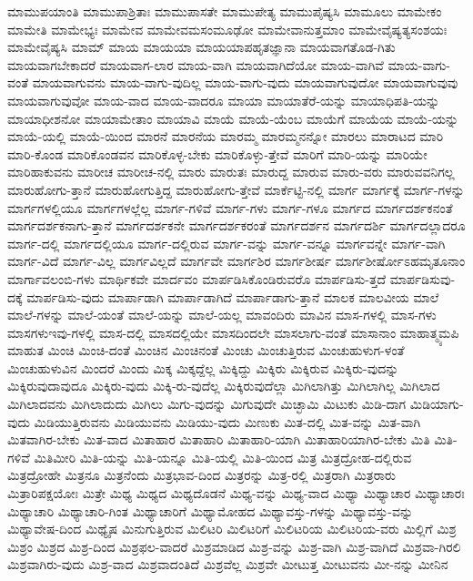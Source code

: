{ಮಾಮುಪಯಾಂತಿ
ಮಾಮುಪಾಶ್ರಿತಾಃ
ಮಾಮುಪಾಸತೇ
ಮಾಮುಪೇತ್ಯ
ಮಾಮುಪೈಷ್ಯಸಿ
ಮಾಮೂಲು
ಮಾಮೇಕಂ
ಮಾಮೇತಿ
ಮಾಮೇಭ್ಯಃ
ಮಾಮೇವ
ಮಾಮೇವಮಸಂಮೂಢೋ
ಮಾಮೇವಾನುತ್ತಮಾಂ
ಮಾಮೇವೈಷ್ಯತ್ಯಸಂಶಯಃ
ಮಾಮೇವೈಷ್ಯಸಿ
ಮಾಮ್
ಮಾಯ
ಮಾಯಯಾ
ಮಾಯಯಾಪಹೃತಜ್ಞಾನಾ
ಮಾಯವಾಗತೊಡ-ಗಿತು
ಮಾಯವಾಗಬೇಕಾದರೆ
ಮಾಯವಾಗ-ಲಾರ
ಮಾಯ-ವಾಗಿ
ಮಾಯವಾಗಿದೆಯೋ
ಮಾಯ-ವಾಗಿವೆ
ಮಾಯ-ವಾಗು-ವಂತೆ
ಮಾಯವಾಗುವನು
ಮಾಯ-ವಾಗು-ವುದಿಲ್ಲ
ಮಾಯ-ವಾಗು-ವುದು
ಮಾಯವಾಗುವುದೋ
ಮಾಯವಾಗುವುವು
ಮಾಯವಾಗುವುವೋ
ಮಾಯ-ವಾದ
ಮಾಯ-ವಾದರೂ
ಮಾಯಾ
ಮಾಯಾತೆರೆ-ಯನ್ನು
ಮಾಯಾಧಿಪತಿ-ಯನ್ನು
ಮಾಯಾಧೀಶನೋ
ಮಾಯಾಮೇತಾಂ
ಮಾಯಾವಿ
ಮಾಯೆ
ಮಾಯೆ-ಯೆಂಬ
ಮಾಯೆಗೆ
ಮಾಯೆಯ
ಮಾಯೆ-ಯನ್ನು
ಮಾಯೆ-ಯಲ್ಲಿ
ಮಾಯೆ-ಯಿಂದ
ಮಾರನೆ
ಮಾರನೆಯ
ಮಾರಮ್ಮ
ಮಾರಮ್ಮನನ್ನೋ
ಮಾರಲು
ಮಾರಾಟದ
ಮಾರಿ
ಮಾರಿ-ಕೊಂಡ
ಮಾರಿಕೊಂಡವನ
ಮಾರಿಕೊಳ್ಳ-ಬೇಕು
ಮಾರಿಕೊಳ್ಳು-ತ್ತೇವೆ
ಮಾರಿಗೆ
ಮಾರಿ-ಯನ್ನು
ಮಾರಿಯೇ
ಮಾರಿಹಾಕುವನು
ಮಾರೀಚ
ಮಾರೀಚ-ನಲ್ಲಿ
ಮಾರು
ಮಾರುತಃ
ಮಾರುದ್ದ
ಮಾರುವ
ಮಾರು-ವರು
ಮಾರುವವನಿಗಲ್ಲ
ಮಾರುಹೋಗು-ತ್ತಾನೆ
ಮಾರುಹೋಗುತ್ತಿದ್ದ
ಮಾರುಹೋಗು-ತ್ತೇವೆ
ಮಾರ್ಕೆಟ್ಟಿ-ನಲ್ಲಿ
ಮಾರ್ಗ
ಮಾರ್ಗಕ್ಕೆ
ಮಾರ್ಗ-ಗಳನ್ನು
ಮಾರ್ಗಗಳಲ್ಲಿಯೂ
ಮಾರ್ಗಗಳಲ್ಲೆಲ್ಲ
ಮಾರ್ಗ-ಗಳಿವೆ
ಮಾರ್ಗ-ಗಳು
ಮಾರ್ಗ-ಗಳೂ
ಮಾರ್ಗದ
ಮಾರ್ಗದರ್ಶಕನಂತೆ
ಮಾರ್ಗದರ್ಶಕನಾಗು-ತ್ತಾನೆ
ಮಾರ್ಗದರ್ಶಕನೇ
ಮಾರ್ಗದರ್ಶಕರಂತೆ
ಮಾರ್ಗದರ್ಶನ
ಮಾರ್ಗದರ್ಶಿ
ಮಾರ್ಗದಲ್ಲಾದರೂ
ಮಾರ್ಗ-ದಲ್ಲಿ
ಮಾರ್ಗದಲ್ಲಿಯೂ
ಮಾರ್ಗ-ದಲ್ಲಿರುವ
ಮಾರ್ಗ-ವನ್ನು
ಮಾರ್ಗ-ವನ್ನೂ
ಮಾರ್ಗವನ್ನೇ
ಮಾರ್ಗ-ವಾಗಿ
ಮಾರ್ಗ-ವಿದೆ
ಮಾರ್ಗ-ವಿಲ್ಲ
ಮಾರ್ಗವಿಲ್ಲದೆ
ಮಾರ್ಗವೇ
ಮಾರ್ಗಶಿರ
ಮಾರ್ಗಶೀರ್ಷ
ಮಾರ್ಗಶೀರ್ಷೋಽಹಮೃತೂನಾಂ
ಮಾರ್ಗಾವಲಂಬಿ-ಗಳು
ಮಾರ್ಥಿಕವೇ
ಮಾರ್ದವಂ
ಮಾರ್ಪಡಿಸಿಕೊಂಡಿರುವರೊ
ಮಾರ್ಪಡಿಸು-ತ್ತದೆ
ಮಾರ್ಪಡಿಸುವು-ದಕ್ಕೆ
ಮಾರ್ಪಡಿಸು-ವುದು
ಮಾರ್ಪಾಡಾಗಿ
ಮಾರ್ಪಾಡಾಗಿದೆ
ಮಾರ್ಪಾಡಾಗು-ತ್ತಾನೆ
ಮಾಲಕ
ಮಾಲವೀಯ
ಮಾಲೆ
ಮಾಲೆ-ಗಳನ್ನು
ಮಾಲೆ-ಯಂತೆ
ಮಾಲೆ-ಯನ್ನು
ಮಾಲೆ-ಯಲ್ಲ
ಮಾವಂದಿರು
ಮಾವಿನ
ಮಾಸ-ಗಳಲ್ಲಿ
ಮಾಸ-ಗಳು
ಮಾಸಗಳುಇವು-ಗಳಲ್ಲಿ
ಮಾಸ-ದಲ್ಲಿ
ಮಾಸದಲ್ಲಿಯೇ
ಮಾಸದಿಂದಲೇ
ಮಾಸಲಾಗು-ವಂತೆ
ಮಾಸಾನಾಂ
ಮಾಹಾತ್ಮ್ಯಮಪಿ
ಮಾಹುತ
ಮಿಂಚಿ
ಮಿಂಚಿ-ದಂತೆ
ಮಿಂಚಿನ
ಮಿಂಚಿನಂತೆ
ಮಿಂಚು
ಮಿಂಚುತ್ತಿರುವ
ಮಿಂಚುಹುಳುಗ-ಳಂತೆ
ಮಿಂಚುಹುಳುವಿನ
ಮಿಂದರೆ
ಮಿಂದು
ಮಿಕ್ಕ
ಮಿಕ್ಕದ್ದೆಲ್ಲ
ಮಿಕ್ಕಿದ್ದು
ಮಿಕ್ಕಿರು
ಮಿಕ್ಕಿರುವ
ಮಿಕ್ಕಿರು-ವುದನ್ನು
ಮಿಕ್ಕಿರುವುದಾವುದೂ
ಮಿಕ್ಕಿರು-ವುದು
ಮಿಕ್ಕಿ-ರು-ವುದೆಲ್ಲ
ಮಿಕ್ಕಿರುವುದೆಲ್ಲಾ
ಮಿಗಿಲಾಗಿತ್ತು
ಮಿಗಿಲಾಗಿಲ್ಲ
ಮಿಗಿಲಾದ
ಮಿಗಿಲಾದವನು
ಮಿಗಿಲಾದುದು
ಮಿಗಿಲು
ಮಿಗು-ವುದನ್ನು
ಮಿಗುವುದೇ
ಮಿಚ್ಛಾಮಿ
ಮಿಟುಕು
ಮಿಡಿ-ದಾಗ
ಮಿಡಿಯಾಗು-ವುದು
ಮಿಡಿಯುತ್ತಿರುವನು
ಮಿಡಿಯುವನು
ಮಿಡಿಯು-ವುದು
ಮಿಣುಕು
ಮಿತ-ದಲ್ಲಿ
ಮಿತ-ವನ್ನು
ಮಿತ-ವಾಗಿ
ಮಿತವಾಗಿರ-ಬೇಕು
ಮಿತ-ವಾದ
ಮಿತಾಹಾರ
ಮಿತಾಹಾರಿ
ಮಿತಾಹಾರಿ-ಯಾಗಿ
ಮಿತಾಹಾರಿಯಾಗಿರ-ಬೇಕು
ಮಿತಿ
ಮಿತಿ-ಗಳಿವೆ
ಮಿತಿಮೀರಿ
ಮಿತಿ-ಯನ್ನು
ಮಿತಿ-ಯನ್ನೂ
ಮಿತಿ-ಯಲ್ಲಿ
ಮಿತಿ-ಯಿಂದ
ಮಿತ್ರ
ಮಿತ್ರದ್ರೋಹ-ದಲ್ಲಿರುವ
ಮಿತ್ರದ್ರೋಹೇ
ಮಿತ್ರನೂ
ಮಿತ್ರನೆಂದು
ಮಿತ್ರಭಾವ-ದಿಂದ
ಮಿತ್ರರನ್ನು
ಮಿತ್ರ-ರಲ್ಲಿ
ಮಿತ್ರರಾಗಿ
ಮಿತ್ರರಾರು
ಮಿತ್ರಾರಿಪಕ್ಷಯೋಃ
ಮಿತ್ರೇ
ಮಿಥ್ಯ
ಮಿಥ್ಯದ
ಮಿಥ್ಯದೊಡನೆ
ಮಿಥ್ಯ-ವನ್ನು
ಮಿಥ್ಯ-ವಾದ
ಮಿಥ್ಯಾ
ಮಿಥ್ಯಾಚಾರ
ಮಿಥ್ಯಾಚಾರಃ
ಮಿಥ್ಯಾಚಾರಿ
ಮಿಥ್ಯಾಚಾರಿ-ಗಿಂತ
ಮಿಥ್ಯಾಚಾರಿಗೆ
ಮಿಥ್ಯಾಮೋಹದ
ಮಿಥ್ಯಾವಸ್ತು-ಗಳನ್ನು
ಮಿಥ್ಯಾವಸ್ತು-ವನ್ನು
ಮಿಥ್ಯಾವೇಷ-ದಿಂದ
ಮಿಥ್ಯೈಷ
ಮಿನುಗುತ್ತಿರುವ
ಮಿಲಿಟರಿ
ಮಿಲಿಟರಿಗೆ
ಮಿಲಿಟರಿಯ
ಮಿಲಿಟರಿಯ-ವರು
ಮಿಲ್ಲಿಗೆ
ಮಿಶ್ರ
ಮಿಶ್ರಂ
ಮಿಶ್ರದ
ಮಿಶ್ರ-ದಿಂದ
ಮಿಶ್ರಫಲ-ವಾದರೆ
ಮಿಶ್ರಮಾಡಿದ
ಮಿಶ್ರ-ವನ್ನು
ಮಿಶ್ರ-ವಾಗಿ
ಮಿಶ್ರ-ವಾಗಿದೆ
ಮಿಶ್ರವಾ-ಗಿರಲಿ
ಮಿಶ್ರವಾಗಿರು-ವುದು
ಮಿಶ್ರ-ವಾದ
ಮಿಶ್ರವಾದಂತಿದೆ
ಮಿಶ್ರವೆಲ್ಲ
ಮಿಶ್ರವೇ
ಮೀಟುತ್ತ
ಮೀಟುವನು
ಮೀ-ನನ್ನು
ಮೀನಿನ
}
